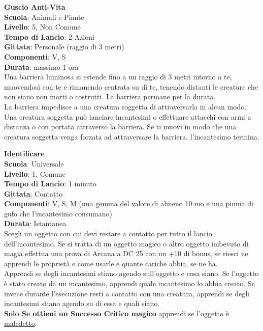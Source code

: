 \begin{multicols}{2}
\medskip\textbf{Guscio Anti-Vita}\\
\textbf{Scuola}: Animali e Piante\\
\textbf{Livello}: 5, Non Comune\\
\textbf{Tempo di Lancio}: 2 Azioni\\
\textbf{Gittata}: Personale (raggio di 3 metri)\\
\textbf{Componenti}: V, S\\
\textbf{Durata}: massimo 1 ora\\
Una barriera luminosa si estende fino a un raggio di 3 metri intorno a te, muovendosi con te e rimanendo centrata su di te, tenendo distanti le creature che non siano non morti o costrutti. La barriera permane per la durata. \\
La barriera impedisce a una creatura soggetta di attraversarla in alcun modo. Una creatura soggetta può lanciare incantesimi o effettuare attacchi con armi a distanza o con portata attraverso la barriera. Se ti muovi in modo che una creatura soggetta venga forzata ad attraversare la barriera, l'incantesimo termina.

\medskip\textbf{Identificare}\hypertarget{incantesimoidentificare}{}\\
\textbf{Scuola}: Universale\\
\textbf{Livello}: 1, Comune\\
\textbf{Tempo di Lancio}: 1 minuto\\
\textbf{Gittata}: Contatto\\
\textbf{Componenti}: V, S, M (una gemma del valore di almeno 10 mo e una piuma di gufo che l'incantesimo consumano)\\
\textbf{Durata}: Istantanea\\
Scegli un oggetto con cui devi restare a contatto per tutto il lancio dell'incantesimo. Se si tratta di un oggetto magico o altro oggetto imbevuto di magia effettua una prova di Arcana a DC 25 con un +10 di bonus, se riesci ne apprendi le proprietà e come usarle e quante cariche abbia, se ne ha. \\
Apprendi se degli incantesimi stiano agendo sull'oggetto e cosa siano. Se l'oggetto è stato creato da un incantesimo, apprendi quale incantesimo lo abbia creato. Se invece durante l'esecuzione resti a contatto con una creatura, apprendi se degli incantesimi stiano agendo su di essa e quali siano.\\
\textbf{Solo Se ottieni un Successo Critico magico} apprendi se l'oggetto è \hyperlink{oggettimaledettiid}{maledetto}.


\end{multicols}
